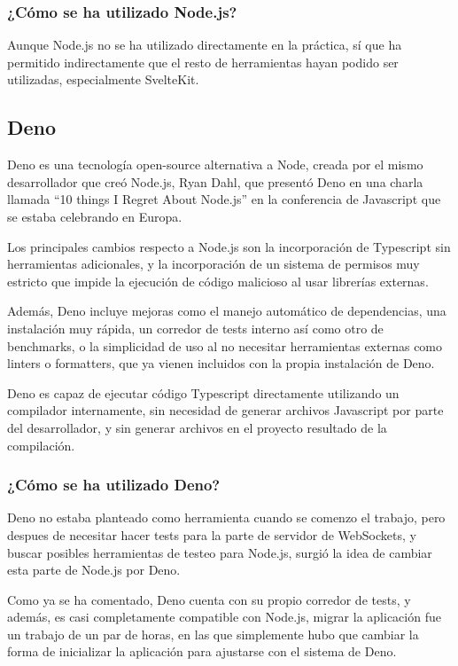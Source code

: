\subsubsection{¿Cómo se ha utilizado Node.js?}
Aunque Node.js no se ha utilizado directamente en la práctica, sí que ha permitido indirectamente que el resto de herramientas hayan podido ser utilizadas, especialmente SvelteKit.


\subsection{Deno}
Deno es una tecnología open-source alternativa a Node, creada por el mismo desarrollador que creó Node.js, Ryan Dahl, que presentó Deno en una charla llamada “10 things I Regret About Node.js” en la conferencia de Javascript que se estaba celebrando en Europa.

Los principales cambios respecto a Node.js son la incorporación de Typescript sin herramientas adicionales, y la incorporación de un sistema de permisos muy estricto que impide la ejecución de código malicioso al usar librerías externas.

Además, Deno incluye mejoras como el manejo automático de dependencias, una instalación muy rápida, un corredor de tests interno así como otro de benchmarks, o la simplicidad de uso al no necesitar herramientas externas como linters o formatters, que ya vienen incluidos con la propia instalación de Deno.

Deno es capaz de ejecutar código Typescript directamente utilizando un compilador internamente, sin necesidad de generar archivos Javascript por parte del desarrollador, y sin generar archivos en el proyecto resultado de la compilación.

\subsubsection{¿Cómo se ha utilizado Deno?}
Deno no estaba planteado como herramienta cuando se comenzo el trabajo, pero despues de necesitar hacer tests para la parte de servidor de WebSockets, y buscar posibles herramientas de testeo para Node.js, surgió la idea de cambiar esta parte de Node.js por Deno.

Como ya se ha comentado, Deno cuenta con su propio corredor de tests, y además, es casi completamente compatible con Node.js, migrar la aplicación fue un trabajo de un par de horas, en las que simplemente hubo que cambiar la forma de inicializar la aplicación para ajustarse con el sistema de Deno.

